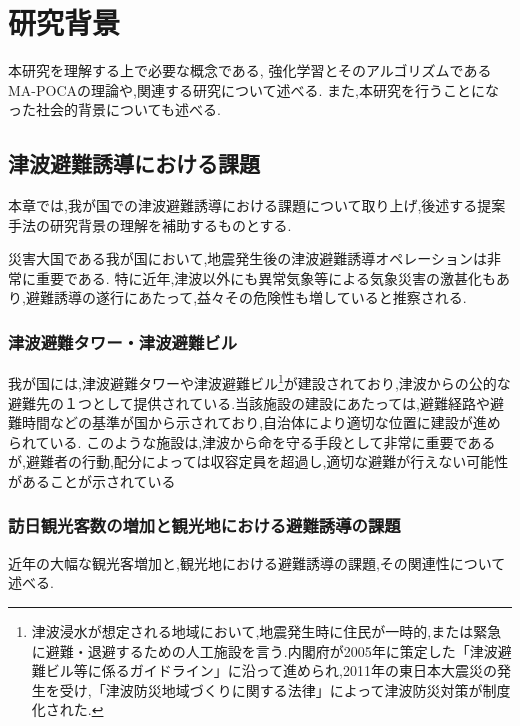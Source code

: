 \chapter{研究背景}

本研究を理解する上で必要な概念である, 強化学習とそのアルゴリズムであるMA-POCAの理論や,関連する研究について述べる.
また,本研究を行うことになった社会的背景についても述べる.

\section{津波避難誘導における課題}
本章では,我が国での津波避難誘導における課題について取り上げ,後述する提案手法の研究背景の理解を補助するものとする.\par 

災害大国である我が国において,地震発生後の津波避難誘導オペレーションは非常に重要である.
特に近年,津波以外にも異常気象等による気象災害の激甚化もあり,避難誘導の遂行にあたって,益々その危険性も増していると推察される.\par 

\subsection{津波避難タワー・津波避難ビル}
我が国には,津波避難タワーや津波避難ビル\footnote{津波浸水が想定される地域において,地震発生時に住民が一時的,または緊急に避難・退避するための人工施設を言う.内閣府が2005年に策定した「津波避難ビル等に係るガイドライン」に沿って進められ,2011年の東日本大震災の発生を受け,「津波防災地域づくりに関する法律」によって津波防災対策が制度化された.}が建設されており,津波からの公的な避難先の１つとして提供されている.当該施設の建設にあたっては,避難経路や避難時間などの基準が国から示されており,自治体により適切な位置に建設が進められている.
このような施設は,津波から命を守る手段として非常に重要であるが,避難者の行動,配分によっては収容定員を超過し,適切な避難が行えない可能性があることが示されている\cite{kouti-01}

\subsection{訪日観光客数の増加と観光地における避難誘導の課題}
近年の大幅な観光客増加と,観光地における避難誘導の課題,その関連性について述べる.
